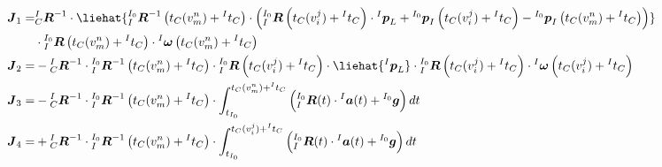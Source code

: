 \begin{equation*}
  \begin{aligned}
    \boldsymbol{J}_1= & {{^{I}_{C}}\boldsymbol{R}^{-1}}\cdot\liehat{{{^{I_0}_{I}}\boldsymbol{R}^{-1}\left( t_{C}(v_m^n)+{^{I}t_C}\right) }\cdot\left( {{^{I_0}_{I}}\boldsymbol{R}\left( t_{C}(v_i^j)+{^{I}t_C}\right)}
    \cdot{^{I}\boldsymbol{p}_L}+{^{I_0}\boldsymbol{p}_I\left( t_{C}(v_i^j)+{^{I}t_C}\right)}-{^{I_0}\boldsymbol{p}_I\left( t_{C}(v_m^n)+{^{I}t_C}\right)}\right) }
    \\
                      & \cdot{{^{I_0}_{I}}\boldsymbol{R}\left( t_{C}(v_m^n)+{^{I}t_C}\right) }
    \cdot{^{I}\boldsymbol{\omega}}\left( t_{C}(v_m^n)+{^{I}t_C}\right)
    \\
    \boldsymbol{J}_2= & -
    {{^{I}_{C}}\boldsymbol{R}^{-1}}\cdot{{^{I_0}_{I}}\boldsymbol{R}^{-1}\left( t_{C}(v_m^n)+{^{I}t_C}\right) }\cdot{{^{I_0}_{I}}\boldsymbol{R}\left( t_{C}(v_i^j)+{^{I}t_C}\right) }
    \cdot\liehat{{^{I}\boldsymbol{p}_L}}
    \cdot{{^{I_0}_{I}}\boldsymbol{R}\left( t_{C}(v_i^j)+{^{I}t_C}\right) }
    \cdot{^{I}\boldsymbol{\omega}}\left( t_{C}(v_i^j)+{^{I}t_C}\right)
    \\
    \boldsymbol{J}_3= & -{{^{I}_{C}}\boldsymbol{R}^{-1}}
    \cdot{{^{I_0}_{I}}\boldsymbol{R}^{-1}\left( t_{C}(v_m^n)+{^{I}t_C}\right) }
    \cdot
    \int_{t_{I_0}}^{t_{C}(v_m^n)+{^{I}t_C}}\left( {^{I_0}_{I}\boldsymbol{R}}(t)\cdot{^{I}\boldsymbol{a}}(t)+{^{I_0}\boldsymbol{g}}\right)dt
    \\
    \boldsymbol{J}_4= & +
    {{^{I}_{C}}\boldsymbol{R}^{-1}}\cdot{{^{I_0}_{I}}\boldsymbol{R}^{-1}\left( t_{C}(v_m^n)+{^{I}t_C}\right) }
    \cdot
    \int_{t_{I_0}}^{t_{C}(v_i^j)+{^{I}t_C}}\left( {^{I_0}_{I}\boldsymbol{R}}(t)\cdot{^{I}\boldsymbol{a}}(t)+{^{I_0}\boldsymbol{g}}\right)dt
  \end{aligned}
\end{equation*}


\newpage
\pagestyle{empty}



\clearpage

